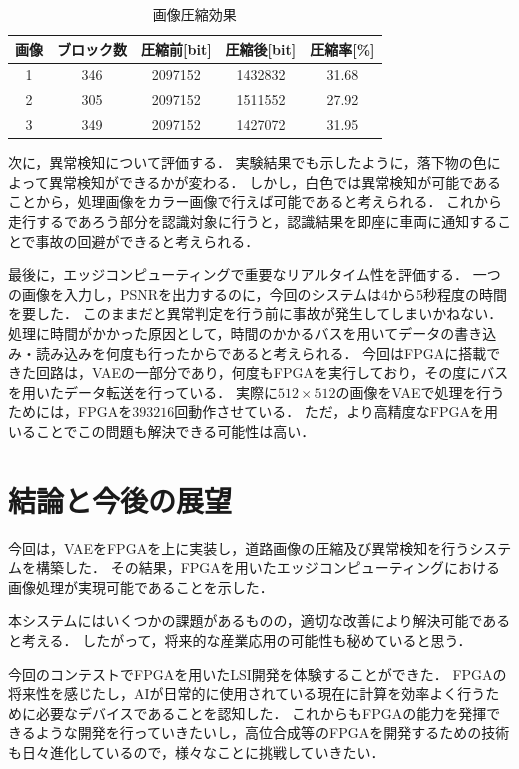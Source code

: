 \documentclass[paper]{ieicej}
\begin{document}
\begin{table}[tb]
  \centering
  \caption{画像圧縮効果}
  \small
  \begin{tabular}{|c|c|c|c|c|} \hline
    画像 & ブロック数 & 圧縮前[bit] & 圧縮後[bit] & 圧縮率[\%]\\ \hline
    1 & 346 & 2097152 & 1432832 & 31.68 \\ \hline
    2 & 305 & 2097152 & 1511552 & 27.92 \\ \hline
    3 & 349 & 2097152 & 1427072 & 31.95 \\ \hline
  \end{tabular}
  \label{tb:4}
\end{table}

次に，異常検知について評価する．
実験結果でも示したように，落下物の色によって異常検知ができるかが変わる．
しかし，白色では異常検知が可能であることから，処理画像をカラー画像で行えば可能であると考えられる．
これから走行するであろう部分を認識対象に行うと，認識結果を即座に車両に通知することで事故の回避ができると考えられる．

最後に，エッジコンピューティングで重要なリアルタイム性を評価する．
一つの画像を入力し，PSNRを出力するのに，今回のシステムは4から5秒程度の時間を要した．
このままだと異常判定を行う前に事故が発生してしまいかねない．
処理に時間がかかった原因として，時間のかかるバスを用いてデータの書き込み・読み込みを何度も行ったからであると考えられる．
今回はFPGAに搭載できた回路は，VAEの一部分であり，何度もFPGAを実行しており，その度にバスを用いたデータ転送を行っている．
実際に$512\times512$の画像をVAEで処理を行うためには，FPGAを$393216$回動作させている．
ただ，より高精度なFPGAを用いることでこの問題も解決できる可能性は高い．

\section{結論と今後の展望}
今回は，VAEをFPGAを上に実装し，道路画像の圧縮及び異常検知を行うシステムを構築した．
その結果，FPGAを用いたエッジコンピューティングにおける画像処理が実現可能であることを示した．

本システムにはいくつかの課題があるものの，適切な改善により解決可能であると考える．
したがって，将来的な産業応用の可能性も秘めていると思う．

今回のコンテストでFPGAを用いたLSI開発を体験することができた．
FPGAの将来性を感じたし，AIが日常的に使用されている現在に計算を効率よく行うために必要なデバイスであることを認知した．
これからもFPGAの能力を発揮できるような開発を行っていきたいし，高位合成等のFPGAを開発するための技術も日々進化しているので，様々なことに挑戦していきたい．
\end{document}
